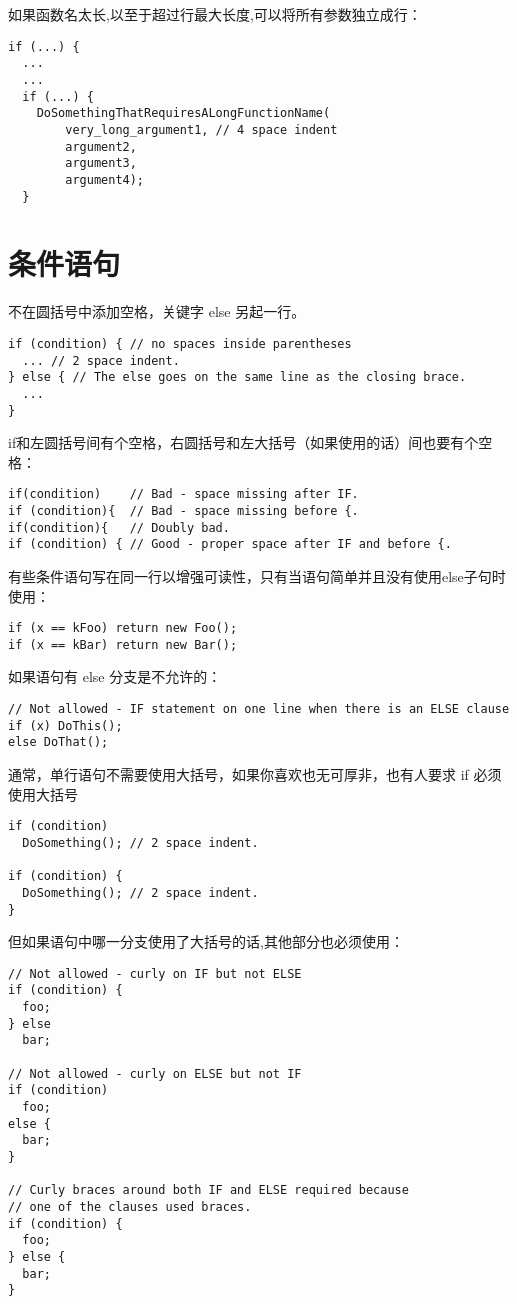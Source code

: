 如果函数名太长,以至于超过行最大长度,可以将所有参数独立成行：
\begin{verbatim}
if (...) {
  ...
  ...
  if (...) {
    DoSomethingThatRequiresALongFunctionName(
        very_long_argument1, // 4 space indent
        argument2,
        argument3,
        argument4);
  }
\end{verbatim}


\section{条件语句}
不在圆括号中添加空格，关键字 else 另起一行。
\begin{verbatim}
if (condition) { // no spaces inside parentheses
  ... // 2 space indent.
} else { // The else goes on the same line as the closing brace.
  ...
}
\end{verbatim}

if和左圆括号间有个空格，右圆括号和左大括号（如果使用的话）间也要有个空格：
\begin{verbatim}
if(condition)    // Bad - space missing after IF.
if (condition){  // Bad - space missing before {.
if(condition){   // Doubly bad.
if (condition) { // Good - proper space after IF and before {.
\end{verbatim}

有些条件语句写在同一行以增强可读性，只有当语句简单并且没有使用else子句时使用：
\begin{verbatim}
if (x == kFoo) return new Foo();
if (x == kBar) return new Bar();
\end{verbatim}

如果语句有 else 分支是不允许的：
\begin{verbatim}
// Not allowed - IF statement on one line when there is an ELSE clause
if (x) DoThis();
else DoThat();
\end{verbatim}

通常，单行语句不需要使用大括号，如果你喜欢也无可厚非，也有人要求 if 必须使用大括号
\begin{verbatim}
if (condition)
  DoSomething(); // 2 space indent.

if (condition) {
  DoSomething(); // 2 space indent.
}
\end{verbatim}

但如果语句中哪一分支使用了大括号的话,其他部分也必须使用：
\begin{verbatim}
// Not allowed - curly on IF but not ELSE
if (condition) {
  foo;
} else
  bar;

// Not allowed - curly on ELSE but not IF
if (condition)
  foo;
else {
  bar;
}

// Curly braces around both IF and ELSE required because
// one of the clauses used braces.
if (condition) {
  foo;
} else {
  bar;
}
\end{verbatim}


